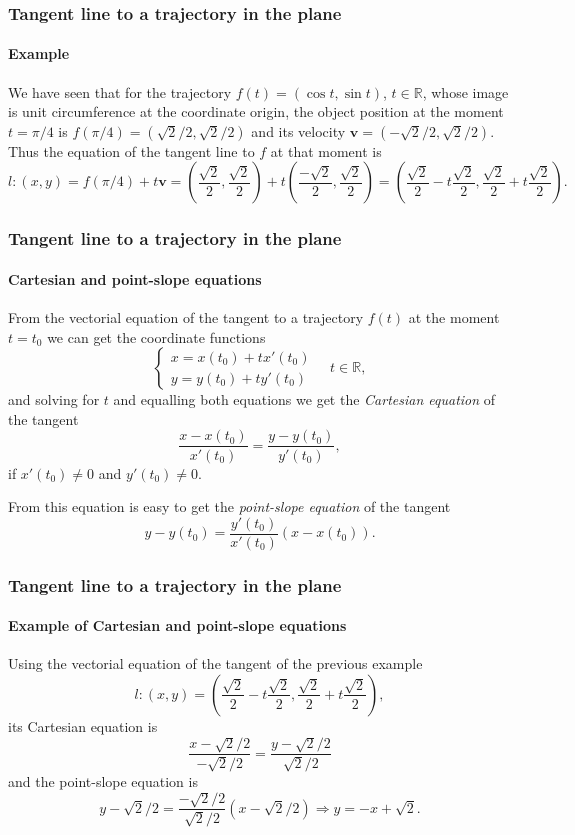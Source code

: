 \begin{frame}
\frametitle{Tangent line to a trajectory in the plane}
\framesubtitle{Example}
We have seen that for the trajectory $f(t) = (\cos t,\sin t)$, $t\in \mathbb{R}$, whose image is unit circumference at the coordinate origin, the object position at the moment $t=\pi/4$ is $f(\pi/4)=(\sqrt{2}/2,\sqrt{2}/2)$ and its velocity $\mathbf{v}=(-\sqrt{2}/2,\sqrt{2}/2)$. 
Thus the equation of the tangent line to $f$ at that moment is 
\[
l: (x,y) = f(\pi/4)+t\mathbf{v} =
\left(\frac{\sqrt{2}}{2},\frac{\sqrt{2}}{2}\right)+t\left(\frac{-\sqrt{2}}{2},\frac{\sqrt{2}}{2}\right) =
\left(\frac{\sqrt{2}}{2}-t\frac{\sqrt{2}}{2},\frac{\sqrt{2}}{2}+t\frac{\sqrt{2}}{2}\right).
\]
\end{frame}


\begin{frame}
\frametitle{Tangent line to a trajectory in the plane}
\framesubtitle{Cartesian and point-slope equations}
From the vectorial equation of the tangent to a trajectory $f(t)$ at the moment $t=t_0$ we can get the coordinate functions
\[
\begin{cases}
x=x(t_0)+tx'(t_0)\\
y=y(t_0)+ty'(t_0)
\end{cases}
\quad t\in \mathbb{R},
\]
and solving for $t$ and equalling both equations we get the \emph{Cartesian equation} of the tangent
\[
\frac{x-x(t_0)}{x'(t_0)}=\frac{y-y(t_0)}{y'(t_0)},
\]
if $x'(t_0)\neq 0$ and $y'(t_0)\neq 0$.

From this equation is easy to get the \emph{point-slope equation} of the tangent
\[
y-y(t_0)=\frac{y'(t_0)}{x'(t_0)}(x-x(t_0)).
\]
\end{frame}


\begin{frame}
\frametitle{Tangent line to a trajectory in the plane}
\framesubtitle{Example of Cartesian and point-slope equations}
Using the vectorial equation of the tangent of the previous example
\[
l: (x,y)=\left(\frac{\sqrt{2}}{2}-t\frac{\sqrt{2}}{2},\frac{\sqrt{2}}{2}+t\frac{\sqrt{2}}{2}\right),
\]
its Cartesian equation is 
\[
\frac{x-\sqrt{2}/2}{-\sqrt{2}/2} = \frac{y-\sqrt{2}/2}{\sqrt{2}/2}
\]
and the point-slope equation is 
\[
y-\sqrt{2}/2 = \frac{-\sqrt{2}/2}{\sqrt{2}/2}(x-\sqrt{2}/2) \Rightarrow y=-x+\sqrt{2}.
\]
\end{frame}


